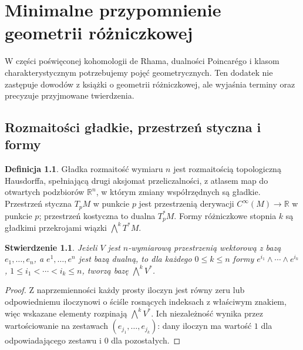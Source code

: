 \documentclass[11pt,a4paper,oneside]{report}
\newcommand{\R}{\mathbb{R}}
\theoremstyle{plain}
\newtheorem{stwierdzenie}[twierdzenie]{Stwierdzenie}
\theoremstyle{definition}
\newtheorem{definicja}[twierdzenie]{Definicja}
\theoremstyle{remark}
\renewcommand{\chaptermark}[1]{\markboth{Rozdział \thechapter}{}}
\begin{document}
\appendix
\renewcommand{\chaptermark}[1]{\markboth{Dodatek \thechapter}{}}
\chapter{Minimalne przypomnienie geometrii różniczkowej}
\label{ch:dodatek-geometria}

W części poświęconej kohomologii de Rhama, dualności Poincarégo i klasom
charakterystycznym potrzebujemy pojęć geometrycznych. Ten dodatek
nie zastępuje dowodów z książki o geometrii różniczkowej, ale wyjaśnia
terminy oraz precyzuje przyjmowane twierdzenia.

\section{Rozmaitości gładkie, przestrzeń styczna i formy}
\begin{definicja}
Gładka rozmaitość wymiaru $n$ jest rozmaitością topologiczną Hausdorffa,
spełniającą drugi aksjomat przeliczalności, z atlasem map do otwartych
podzbiorów $\R^n$, w którym zmiany współrzędnych są gładkie.
Przestrzeń styczna $T_pM$ w punkcie $p$ jest przestrzenią derywacji
$C^\infty(M)\to\R$ w punkcie $p$; przestrzeń kostyczna to dualna
$T_p^*M$. Formy różniczkowe stopnia $k$ są gładkimi przekrojami
wiązki $\bigwedge^kT^*M$.
\end{definicja}
\begin{stwierdzenie}
Jeżeli $V$ jest $n$-wymiarową przestrzenią wektorową z bazą
$e_1,\dots,e_n$, a $e^1,\dots,e^n$ jest bazą dualną,
to dla każdego $0\leq k\leq n$ formy
$e^{i_1}\wedge\cdots\wedge e^{i_k}$,
$1\leq i_1<\cdots<i_k\leq n$, tworzą bazę $\bigwedge^k V^*$.
\end{stwierdzenie}
\begin{proof}
Z naprzemienności każdy prosty iloczyn jest równy zeru lub
odpowiedniemu iloczynowi o ściśle rosnących indeksach z właściwym znakiem,
więc wskazane elementy rozpinają $\bigwedge^kV^*$.
Ich niezależność wynika przez wartościowanie na zestawach
$(e_{j_1},\dots,e_{j_k})$: dany iloczyn ma wartość $1$ dla
odpowiadającego zestawu i $0$ dla pozostałych.
\end{proof}
\end{document}
